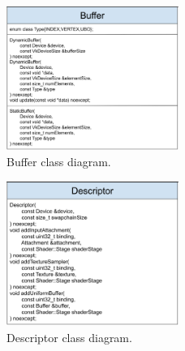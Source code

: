 \documentclass[12pt]{report}
\newcommand{\figurewidth}{0.6\textwidth}
\newcommand{\imagewidth}{0.5\textwidth}
\theoremstyle{definition}
\begin{document}
  \lipsum[3]

  \begin{figure}
    \centering
    \includegraphics[width=\imagewidth]{images/class_buffer.png}
    \caption{Buffer class diagram.}
    \label{fig:class_buffer}  
  \end{figure}

  \begin{figure}
    \centering
    \includegraphics[width=\imagewidth]{images/class_descriptor.png}
    \caption{Descriptor class diagram.}
    \label{fig:class_descriptor}
  \end{figure}
\end{document}
